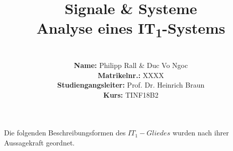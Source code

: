 \documentclass{article}
\title{\textbf{Signale \& Systeme \\ Analyse eines IT\textsubscript{1}-Systems}}
\author{
\vspace{8em} \\
\textbf{Name:} Philipp Rall \& Duc Vo Ngoc \\
\textbf{Matrikelnr.:} XXXX   \\
\textbf{Studiengangsleiter:} Prof. Dr. Heinrich Braun\\
\textbf{Kurs:} TINF18B2 \\
\vspace{8em} 
}
\begin{document}
\maketitle
\newpage
\noindent
Die folgenden Beschreibungsformen des $IT_1-Gliedes$ wurden nach ihrer Aussagekraft geordnet.












\end{document}
